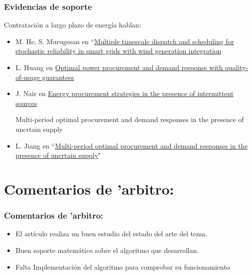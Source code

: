 \documentclass[11pt]{beamer}					%
\begin{document}
\begin{frame}[fragile]						%
	\frametitle{Evidencias de soporte}					
	\begin{center}
		Contratación a largo plazo de energía hablan:
		 \begin{itemize}	
		 	
		 	
		 	\item  M. He, S. Murugesan en “\href{http://arxiv.org/pdf/1008.3932.pdf}{Multiple timescale dispatch and scheduling for stochastic reliability in smart grids with wind generation integration}
		 	
		 	
		 	
		 	\item	L. Huang en \href{https://arxiv.org/pdf/1112.0623.pdf}{Optimal power procurement and demand response with quality-of-usage guarantees}
		 	
		 	\item J. Nair en  \href{http://users.cms.caltech.edu/~adamw/papers/Wind-preprint.pdf}{Energy procurement strategies in the presence of intermittent sources}
		 	
		 	
		 	Multi-period optimal procurement and demand responses in the presence of uncrtain supply
		 	\item L. Jiang en  “\href{http://smart.caltech.edu/papers/multiperiod.pdf}{Multi-period optimal procurement and demand responses in the presence of uncrtain supply}"
		 	
		 	
		 \end{itemize}	
		
	\end{center}
\end{frame}



\section{Comentarios de 'arbitro:}
\begin{frame}[fragile]						%
	\frametitle{Comentarios de 'arbitro:}					
	\begin{center}
		
		\begin{itemize}
			 
		\item	El artículo realiza un buen estudio del estado del arte del tema.
			
		\item	Buen soporte matemático sobre el algoritmo que desarrollan.
			
		\item	Falta Implementación del algoritmo para comprobar su funcionamiento 
		\end{itemize}
	\end{center}
\end{frame}
\end{document}
